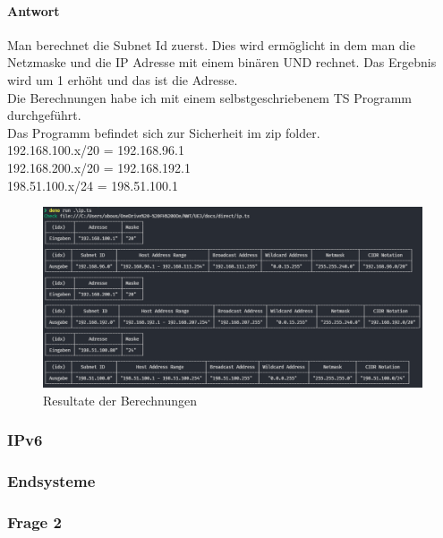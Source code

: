 \paragraph{Antwort}
Man berechnet die Subnet Id zuerst. Dies wird ermöglicht in dem man die Netzmaske und die IP Adresse mit einem binären UND rechnet. Das Ergebnis wird um 1 erhöht und das ist die Adresse.\\
Die Berechnungen habe ich mit einem selbstgeschriebenem TS Programm durchgeführt.\\
Das Programm befindet sich zur Sicherheit im zip folder.\\
192.168.100.x/20 = 192.168.96.1 \\
192.168.200.x/20 = 192.168.192.1 \\
198.51.100.x/24 = 198.51.100.1
\begin{figure}[!htb]
    \centering
    \includegraphics[width=\textwidth]{./img/config/frage1.png}
    \caption{Resultate der Berechnungen}
\end{figure}
\subsubsection{IPv6}
\subsubsection{Endsysteme}
\subsubsection{Frage 2}

